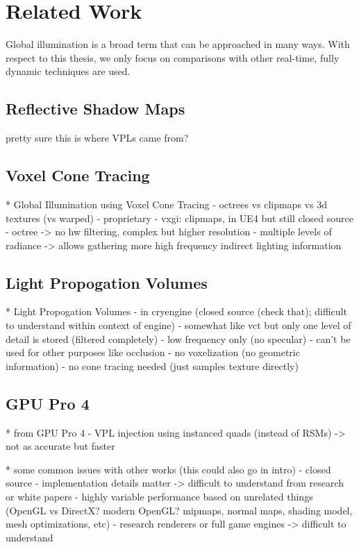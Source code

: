 \chapter{Related Work}

Global illumination is a broad term that can be approached in many ways. With respect to this thesis, we only focus on comparisons with other real-time, fully dynamic techniques are used.

\section{Reflective Shadow Maps}
pretty sure this is where VPLs came from?

\section{Voxel Cone Tracing}
* Global Illumination using Voxel Cone Tracing
    - octrees vs clipmaps vs 3d textures (vs warped)
    - proprietary
    - vxgi: clipmaps, in UE4 but still closed source
    - octree -> no hw filtering, complex but higher resolution
    - multiple levels of radiance -> allows gathering more high frequency indirect lighting information

\section{Light Propogation Volumes}
* Light Propogation Volumes
    - in cryengine (closed source (check that); difficult to understand within context of engine)
    - somewhat like vct but only one level of detail is stored (filtered completely)
        - low frequency only (no specular)
        - can't be used for other purposes like occlusion
    - no voxelization (no geometric information)
    - no cone tracing needed (just samples texture directly)

\section{GPU Pro 4}
* from GPU Pro 4
    - VPL injection using instanced quads (instead of RSMs) -> not as accurate but faster

* some common issues with other works (this could also go in intro)
    - closed source
        - implementation details matter -> difficult to understand from research or white papers
        - highly variable performance based on unrelated things (OpenGL vs DirectX? modern OpenGL? mipmaps, normal maps, shading model, mesh optimizations, etc)
    - research renderers or full game engines -> difficult to understand